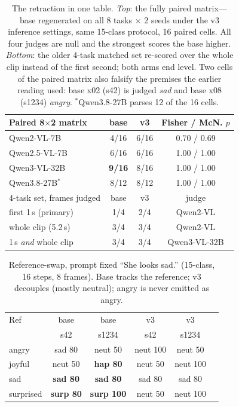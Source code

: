 \documentclass[conference]{IEEEtran}
\begin{document}
\begin{table}[!t]
\centering\footnotesize
\caption{The retraction in one table. \emph{Top}: the fully paired matrix---base regenerated on all 8
tasks $\times$ 2 seeds under the v3 inference settings, same 15-class protocol, 16 paired cells. All four
judges are null and the strongest scores the base higher. \emph{Bottom}: the older 4-task matched set
re-scored over the whole clip instead of the first second; both arms end level. Two cells of the paired
matrix also falsify the premises the earlier reading used: base x02 (s42) is judged \emph{sad} and base
x08 (s1234) \emph{angry}. $^{*}$Qwen3.8-27B parses 12 of the 16 cells.}
\label{tab:retract}
\begin{tabular}{@{}lccc@{}}
\toprule
Paired 8$\times$2 matrix & base & v3 & Fisher / McN. $p$\\
\midrule
Qwen2-VL-7B      & 4/16 & 6/16 & 0.70 / 0.69\\
Qwen2.5-VL-7B    & 6/16 & 6/16 & 1.00 / 1.00\\
Qwen3-VL-32B     & \textbf{9/16} & 8/16 & 1.00 / 1.00\\
Qwen3.8-27B$^{*}$ & 8/12 & 8/12 & 1.00 / 1.00\\
\midrule
4-task set, frames judged & base & v3 & judge\\
\midrule
first 1\,s (primary)  & 1/4 & 2/4 & Qwen2-VL\\
whole clip (5.2\,s)   & 3/4 & 3/4 & Qwen2-VL\\
1\,s \emph{and} whole clip & 3/4 & 3/4 & Qwen3-VL-32B\\
\bottomrule
\end{tabular}
\end{table}

\begin{table}[!t]
\centering\footnotesize
\caption{Reference-swap, prompt fixed ``She looks sad.'' (15-class, 16 steps, 8 frames). Base tracks the
reference; v3 decouples (mostly neutral); angry is never emitted as angry.}
\label{tab:mechanism}
\begin{tabular}{@{}lccccc@{}}
\toprule
Ref & base & base & v3 & v3\\
 & s42 & s1234 & s42 & s1234\\
\midrule
angry & sad 80 & neut 50 & neut 100 & neut 50\\
joyful & neut 50 & \textbf{hap 80} & neut 50 & neut 100\\
sad & \textbf{sad 80} & \textbf{sad 80} & sad 80 & sad 80\\
surprised & \textbf{surp 80} & \textbf{surp 100} & neut 50 & neut 100\\
\bottomrule
\end{tabular}
\end{table}
\end{document}
